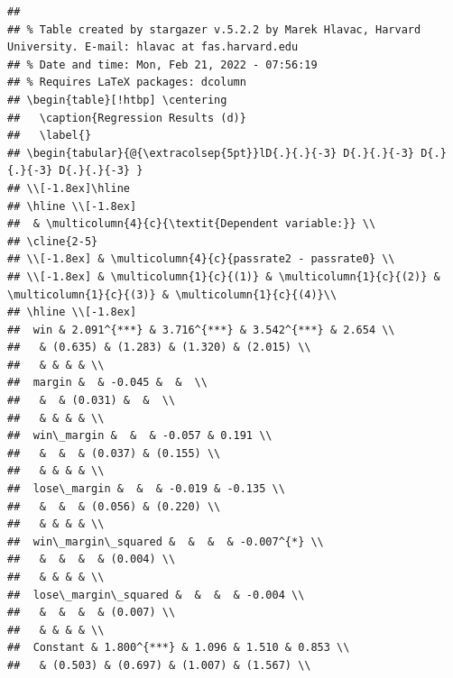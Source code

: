 \documentclass[
  12pt,
  landscape]{article}
\begin{document}
\begin{verbatim}
## 
## % Table created by stargazer v.5.2.2 by Marek Hlavac, Harvard University. E-mail: hlavac at fas.harvard.edu
## % Date and time: Mon, Feb 21, 2022 - 07:56:19
## % Requires LaTeX packages: dcolumn 
## \begin{table}[!htbp] \centering 
##   \caption{Regression Results (d)} 
##   \label{} 
## \begin{tabular}{@{\extracolsep{5pt}}lD{.}{.}{-3} D{.}{.}{-3} D{.}{.}{-3} D{.}{.}{-3} } 
## \\[-1.8ex]\hline 
## \hline \\[-1.8ex] 
##  & \multicolumn{4}{c}{\textit{Dependent variable:}} \\ 
## \cline{2-5} 
## \\[-1.8ex] & \multicolumn{4}{c}{passrate2 - passrate0} \\ 
## \\[-1.8ex] & \multicolumn{1}{c}{(1)} & \multicolumn{1}{c}{(2)} & \multicolumn{1}{c}{(3)} & \multicolumn{1}{c}{(4)}\\ 
## \hline \\[-1.8ex] 
##  win & 2.091^{***} & 3.716^{***} & 3.542^{***} & 2.654 \\ 
##   & (0.635) & (1.283) & (1.320) & (2.015) \\ 
##   & & & & \\ 
##  margin &  & -0.045 &  &  \\ 
##   &  & (0.031) &  &  \\ 
##   & & & & \\ 
##  win\_margin &  &  & -0.057 & 0.191 \\ 
##   &  &  & (0.037) & (0.155) \\ 
##   & & & & \\ 
##  lose\_margin &  &  & -0.019 & -0.135 \\ 
##   &  &  & (0.056) & (0.220) \\ 
##   & & & & \\ 
##  win\_margin\_squared &  &  &  & -0.007^{*} \\ 
##   &  &  &  & (0.004) \\ 
##   & & & & \\ 
##  lose\_margin\_squared &  &  &  & -0.004 \\ 
##   &  &  &  & (0.007) \\ 
##   & & & & \\ 
##  Constant & 1.800^{***} & 1.096 & 1.510 & 0.853 \\ 
##   & (0.503) & (0.697) & (1.007) & (1.567) \\ 

\end{verbatim}
\end{document}
